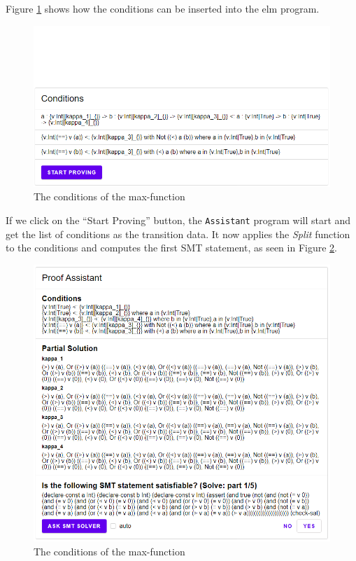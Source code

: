 \documentclass[]{scrbook}
\theoremstyle{definition}
\theoremstyle{definition}
\theoremstyle{definition}
\theoremstyle{remark}
\begin{document}
Figure \ref{fig:assistant1} shows how the conditions can be inserted
into the elm program.

\begin{figure}

{\centering \includegraphics[width=0.75\linewidth]{1} 

}

\caption{The conditions of the max-function}\label{fig:assistant1}
\end{figure}

If we click on the \enquote{Start Proving} button, the
\texttt{Assistant} program will start and get the list of conditions as
the transition data. It now applies the \emph{Split} function to the
conditions and computes the first SMT statement, as seen in Figure
\ref{fig:assistant2}.

\begin{figure}

{\centering \includegraphics[width=0.75\linewidth]{2} 

}

\caption{The conditions of the max-function}\label{fig:assistant2}
\end{figure}
\end{document}
